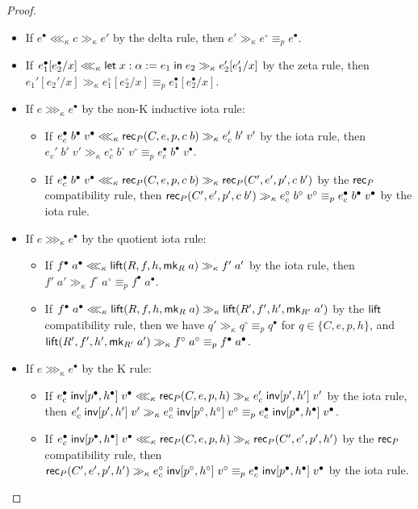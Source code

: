\begin{proof}
\begin{itemize}
\begin{itemize}
\end{itemize}
\item If $e^\bullet\lll_\kappa c\gg_\kappa e'$ by the delta rule, then $e'\gg_\kappa e^\circ\equiv_p e^\bullet$.
\item If $e_1^\bullet[e_2^\bullet/x]\lll_\kappa\mathsf{let}\;x:\alpha:=e_1\mathrel{\mathsf{in}}e_2\gg_\kappa e_2'[e_1'/x]$ by the zeta rule, then $e_1'[e_2'/x]\gg_\kappa e_1^\circ[e_2^\circ/x]\equiv_p e_1^\bullet[e_2^\bullet/x]$.
\item If $e\ggg_\kappa e^\bullet$ by the non-K inductive iota rule:
\begin{itemize}
\item If $e_c^\bullet\;b^\bullet\;v^\bullet\lll_\kappa \mathsf{rec}_P(C,e,p,c\;b)\gg_\kappa e_c'\;b'\;v'$ by the iota rule, then $e_c'\;b'\;v'\gg_\kappa e_c^\circ\;b^\circ\;v^\circ\equiv_p e_c^\bullet\;b^\bullet\;v^\bullet$.
\item If $e_c^\bullet\;b^\bullet\;v^\bullet\lll_\kappa \mathsf{rec}_P(C,e,p,c\;b)\gg_\kappa \mathsf{rec}_P(C',e',p',c\;b')$ by the $\mathsf{rec}_P$ compatibility rule, then $\mathsf{rec}_P(C',e',p',c\;b')\gg_\kappa e_c^\circ\;b^\circ\;v^\circ\equiv_p e_c^\bullet\;b^\bullet\;v^\bullet$ by the iota rule.
\end{itemize}
\item If $e\ggg_\kappa e^\bullet$ by the quotient iota rule:
\begin{itemize}
\item If $f^\bullet\;a^\bullet\lll_\kappa \mathsf{lift}(R,f,h,\mathsf{mk}_R\;a)\gg_\kappa f'\;a'$ by the iota rule, then $f'\;a'\gg_\kappa f^\circ\;a^\circ\equiv_p f^\bullet\;a^\bullet$.
\item If $f^\bullet\;a^\bullet\lll_\kappa \mathsf{lift}(R,f,h,\mathsf{mk}_R\;a)\gg_\kappa\mathsf{lift}(R',f',h',\mathsf{mk}_{R'}\;a')$ by the $\mathsf{lift}$ compatibility rule, then we have $q'\gg_\kappa q^\circ\equiv_p q^\bullet$ for $q\in\{C,e,p,h\}$, and $\mathsf{lift}(R',f',h',\mathsf{mk}_{R'}\;a')\gg_\kappa f^\circ\;a^\circ\equiv_p f^\bullet\;a^\bullet$.
\end{itemize}
\item If $e\ggg_\kappa e^\bullet$ by the K rule:
\begin{itemize}
\item If $e_c^\bullet\;\mathsf{inv}[p^\bullet,h^\bullet]\;v^\bullet\lll_\kappa \mathsf{rec}_P(C,e,p,h)\gg_\kappa e_c'\;\mathsf{inv}[p',h']\;v'$ by the iota rule, then $e_c'\;\mathsf{inv}[p',h']\;v'\gg_\kappa e_c^\circ\;\mathsf{inv}[p^\circ,h^\circ]\;v^\circ\equiv_p e_c^\bullet\;\mathsf{inv}[p^\bullet,h^\bullet]\;v^\bullet$.
\item If $e_c^\bullet\;\mathsf{inv}[p^\bullet,h^\bullet]\;v^\bullet\lll_\kappa \mathsf{rec}_P(C,e,p,h)\gg_\kappa \mathsf{rec}_P(C',e',p',h')$ by the $\mathsf{rec}_P$ compatibility rule, then $\mathsf{rec}_P(C',e',p',h')\gg_\kappa e_c^\circ\;\mathsf{inv}[p^\circ,h^\circ]\;v^\circ\equiv_p e_c^\bullet\;\mathsf{inv}[p^\bullet,h^\bullet]\;v^\bullet$ by the iota rule.

\end{itemize}
\end{itemize}
\end{proof}
